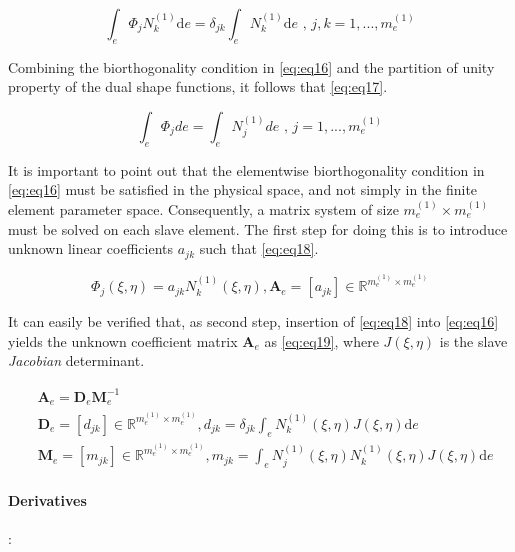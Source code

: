 \documentclass[a4paper,10pt]{article} %
\begin{document}
\begin{equation}\label{eq:eq16}
 \int_{e}\Phi_j N_k^{(1)} \text{d}e = \delta_{jk} \int_{e} N_k^{(1)} \text{d}e \text{ , } j,k=1,...,m_e^{(1)}
\end{equation}

Combining the biorthogonality condition in \eqref{eq:eq16} and the partition of unity property of the dual shape functions, it follows that \eqref{eq:eq17}.

\begin{equation}\label{eq:eq17}
 \int_e \Phi_j de =  \int_e N_j^{(1)} de \text{ , } j=1,...,m_e^{(1)}
\end{equation}

It is important to point out that the elementwise biorthogonality condition in \eqref{eq:eq16} must be satisfied in the physical space, and not simply in the finite element parameter space. Consequently, a matrix system of size $m_e^{(1)} \times m_e^{(1)}$ must be solved on each slave element. The first step for doing this is to introduce unknown linear coefficients $a_{jk}$ such that \eqref{eq:eq18}.

\begin{equation}\label{eq:eq18}
 \Phi_j(\xi, \eta) = a_{jk} N_k^{(1)}\left(\xi, \eta \right), \mathbf{A}_e = [a_{jk}] \in \mathbb{R}^{m_e^{(1)} \times m_e^{(1)}}
 \end{equation}
 
 It can easily be verified that, as second step, insertion of \eqref{eq:eq18} into \eqref{eq:eq16} yields the unknown
coefficient matrix $\mathbf{A}_e$ as \eqref{eq:eq19}, where $J(\xi, \eta)$ is the slave \textit{Jacobian} determinant.

\begin{equation}\label{eq:eq19}
\begin{aligned}
 & \mathbf{A}_e = \mathbf{D}_e\mathbf{M}_e^{-1} \\
 & \mathbf{D}_e = [d_{jk}] \in \mathbb{R}^{m_e^{(1)} \times m_e^{(1)}}, d_{jk} = \delta_{jk} \int_e N_k^{(1)}(\xi, \eta) J(\xi, \eta) \text{d}e \\
 & \mathbf{M}_e = [m_{jk}] \in \mathbb{R}^{m_e^{(1)} \times m_e^{(1)}}, m_{jk} = \int_e N_j^{(1)}(\xi, \eta) N_k^{(1)}(\xi, \eta) J(\xi, \eta) \text{d}e
\end{aligned}
 \end{equation}

\paragraph{Derivatives}:
\end{document}

